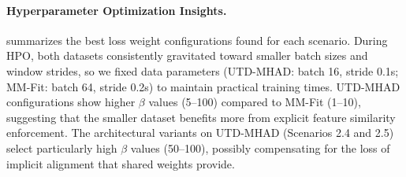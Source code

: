 \paragraph{Hyperparameter Optimization Insights.}
 summarizes the best loss weight configurations found for each scenario. During HPO, both datasets consistently gravitated toward smaller batch sizes and window strides, so we fixed data parameters (UTD-MHAD: batch 16, stride 0.1s; MM-Fit: batch 64, stride 0.2s) to maintain practical training times. UTD-MHAD configurations show higher $\beta$ values (5--100) compared to MM-Fit (1--10), suggesting that the smaller dataset benefits more from explicit feature similarity enforcement. The architectural variants on UTD-MHAD (Scenarios 2.4 and 2.5) select particularly high $\beta$ values (50--100), possibly compensating for the loss of implicit alignment that shared weights provide.

